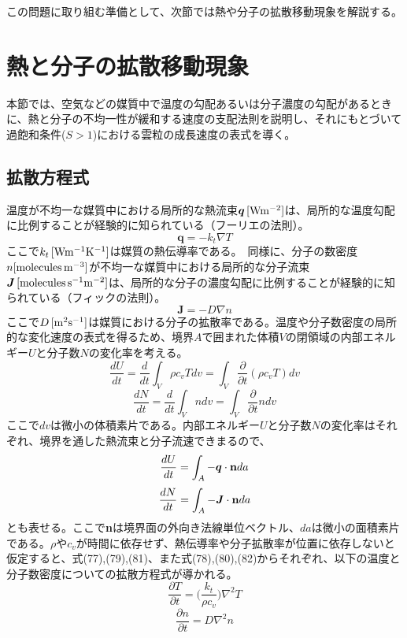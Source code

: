 \documentclass{jsarticle}
\begin{document}
この問題に取り組む準備として、次節では熱や分子の拡散移動現象を解説する。

\section{熱と分子の拡散移動現象}
本節では、空気などの媒質中で温度の勾配あるいは分子濃度の勾配があるときに、熱と分子の不均一性が緩和する速度の支配法則を説明し、それにもとづいて過飽和条件($S>1$)における雲粒の成長速度の表式を導く。

\subsection{拡散方程式}
温度が不均一な媒質中における局所的な熱流束$\bm{q}\, \rm[Wm^{-2}]$は、局所的な温度勾配に比例することが経験的に知られている（フーリエの法則）。
\begin{equation}
\bm{q}=-k_{t}\nabla T
\end{equation}
ここで$k_{t} \, \rm[W m^{-1} K^{-1}]$は媒質の熱伝導率である。　同様に、分子の数密度$n\rm[molecules\, m^{-3}]$が不均一な媒質中における局所的な分子流束$\bm{J}\, \rm[molecules\, s^{-1}m^{-2}]$は、局所的な分子の濃度勾配に比例することが経験的に知られている（フィックの法則）。
\begin{equation}
\bm{J}=-D\nabla n
\end{equation}
ここで$D \, \rm[m^{2} s^{-1}]$は媒質における分子の拡散率である。温度や分子数密度の局所的な変化速度の表式を得るため、境界$A$で囲まれた体積$V$の閉領域の内部エネルギー$U$と分子数$N$の変化率を考える。
\begin{equation}
\frac{dU}{dt}=\frac{d}{dt} \int_{V} \rho c_{v}T dv = \int_{V} \frac {\partial}{\partial t} (\rho c_{v}T) dv
\end{equation}
\begin{equation}
\frac{dN}{dt}=\frac{d}{dt} \int_{V} n dv = \int_{V} \frac {\partial}{\partial t} n dv
\end{equation}
ここで$dv$は微小の体積素片である。内部エネルギー$U$と分子数$N$の変化率はそれぞれ、境界を通した熱流束と分子流速できまるので、
\begin{equation}
\frac{dU}{dt}=\int_{A} -\bm{q}\cdot {\bf n} da
\end{equation}
\begin{equation}
\frac{dN}{dt}=\int_{A} -\bm{J}\cdot {\bf n} da
\end{equation}
とも表せる。ここで{\bf n}は境界面の外向き法線単位ベクトル、$da$は微小の面積素片である。$\rho$や$c_{v}$が時間に依存せず、熱伝導率や分子拡散率が位置に依存しないと仮定すると、式(77),(79),(81)、また式(78),(80),(82)からそれぞれ、以下の温度と分子数密度についての拡散方程式が導かれる。
\begin{equation}
\frac{\partial T}{\partial t}= {\bigg (}\frac{k_{t}}{\rho c_{v}}{\bigg )}\nabla^{2}T
\end{equation}
\begin{equation}
\frac{\partial n}{\partial t}= D\nabla^{2}n
\end{equation}
\end{document}

